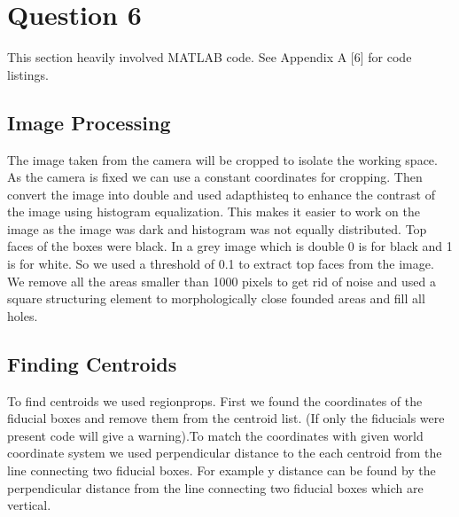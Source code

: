 \newpage
\section{Question 6}
	This section heavily involved MATLAB code. See Appendix A [6] for code listings.
	\subsection{Image Processing}
	\newline The image taken from the camera will be cropped to isolate the working space. As the camera is fixed we can use a constant coordinates for cropping. Then convert the image into double and used adapthisteq to enhance the contrast of the image using histogram equalization. This makes it easier to work on the image as the image was dark and histogram was not equally distributed.  Top faces of the boxes were black. In a grey image which is double 0 is for black and 1 is for white. So we used a threshold of 0.1 to extract top faces from the image. We remove all the areas smaller than 1000 pixels to get rid of noise and used a square structuring element to morphologically close founded areas and fill all holes.\newline

	\subsection{Finding Centroids}
	\newline To find centroids we used regionprops. First we found the coordinates of the fiducial boxes and remove them from the centroid list. (If only the fiducials were present code will give a warning).To match the coordinates with given world coordinate system we used perpendicular distance to the each centroid from the line connecting two fiducial boxes. For example y distance can be found by the perpendicular distance from the line connecting two fiducial boxes which are vertical. \newline
	\pagebreak
